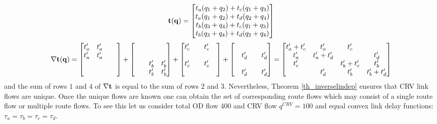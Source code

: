 \documentclass[a4paper,11pt]{article}
\begin{document}
\begin{equation*}
\bold{t}(\bold{q}) = \begin{bmatrix}
t_a(q_1 + q_2) + t_c(q_1 + q_3)\\
t_a(q_1 + q_2) + t_d(q_2 + q_4)\\
t_b(q_3 + q_4) +  t_c(q_1 + q_3)\\
t_b(q_3 + q_4) +  t_d(q_2 + q_4)
\end{bmatrix}
\end{equation*}
\begin{eqnarray*} 
\nabla \bold{t}(\bold{q}) = 
\begin{bmatrix}
t_a' & t_a' &  &\\
t_a' & t_a' & &\\
 & & & \\
& & & 
\end{bmatrix}
+ 
\begin{bmatrix}
&  &  &\\
 &  & &\\
 & & t_b' & t_b'\\
& & t_b'&t_b' 
\end{bmatrix}
+ 
\begin{bmatrix}
t_c'&  &t_c'  &\\
 &  & &\\
t_c' & &t_c'  & \\
& & & 
\end{bmatrix}
+
\begin{bmatrix}
&  &  &\\
 & t_d' & &t_d'\\
 & & & \\
& t_d'& &t_d' 
\end{bmatrix}
=
\begin{bmatrix}
t_a' + t_c' & t_a' & t_c' &\\
t_a' & t_a' + t_d' & &t_d'\\
t_c' & & t_b' + t_c' & t_b'\\
&t_d' &t_b'& t_b' + t_d'
\end{bmatrix}
\end{eqnarray*}
and the sum of rows $1$ and $4$ of $\nabla \bold{t}$ is equal to the sum of rows $2$ and $3$. Nevertheless, Theorem \ref{th_inverselindep} ensures that CRV link flows are unique. Once the unique flows are known one can obtain the set of corresponding route flows which may consist of a single route flow or multiple route flows. To see this let us consider total OD flow $400$ and CRV flow $q^{CRV} = 100$ and equal convex link delay functions: $\tau_a = \tau_b = \tau_c = \tau_d$.  
\end{document}
